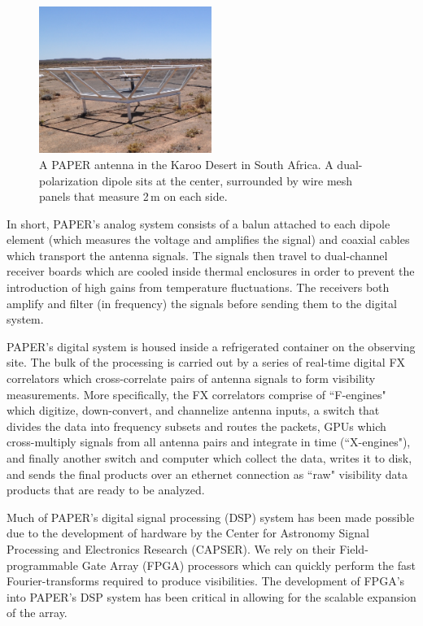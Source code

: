 \begin{figure}
    \centering
    \includegraphics[width=0.5\textwidth]{plots/paper_dipole2.jpg}
    \caption{A PAPER antenna in the Karoo Desert in South Africa. A dual-polarization dipole sits at the center, surrounded by wire mesh panels that measure 2\,m on each side.}
    \label{fig:paper_dipole}
\end{figure}

In short, PAPER's analog system consists of a balun attached to each dipole element (which measures the voltage and amplifies the signal) and coaxial cables which transport the antenna signals. The signals then travel to dual-channel receiver boards which are cooled inside thermal enclosures in order to prevent the introduction of high gains from temperature fluctuations. The receivers both amplify and filter (in frequency) the signals before sending them to the digital system. 

PAPER's digital system is housed inside a refrigerated container on the observing site. The bulk of the processing is carried out by a series of real-time digital FX correlators which cross-correlate pairs of antenna signals to form visibility measurements. More specifically, the FX correlators comprise of ``F-engines" which digitize, down-convert, and channelize antenna inputs, a switch that divides the data into frequency subsets and routes the packets, GPUs which cross-multiply signals from all antenna pairs and integrate in time (``X-engines"), and finally another switch and computer which collect the data, writes it to disk, and sends the final products over an ethernet connection as ``raw" visibility data products that are ready to be analyzed. 

Much of PAPER's digital signal processing (DSP) system has been made possible due to the development of hardware by the Center for Astronomy Signal Processing and Electronics Research (CAPSER). We rely on their Field-programmable Gate Array (FPGA) processors which can quickly perform the fast Fourier-transforms required to produce visibilities. The development of FPGA's into PAPER's DSP system has been critical in allowing for the scalable expansion of the array. 

